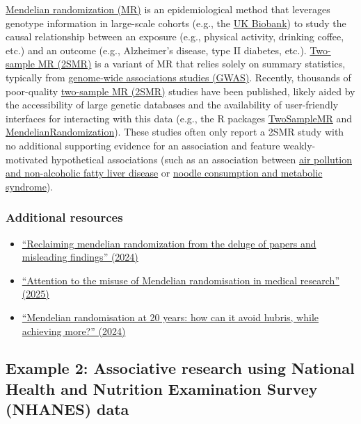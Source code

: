 \documentclass[letterpaper, 12pt]{article}
\begin{document}
\href{https://doi.org/10.1038/s43586-021-00092-5}{Mendelian randomization (MR)} is an epidemiological method that leverages genotype information in large-scale cohorts (e.g., the \href{https://www.ukbiobank.ac.uk/}{UK Biobank}) to study the causal relationship between an exposure (e.g., physical activity, drinking coffee, etc.) and an outcome (e.g., Alzheimer's disease, type II diabetes, etc.). \href{https://doi.org/10.1093/ije/dyx028}{Two-sample MR (2SMR)} is a variant of MR that relies solely on summary statistics, typically from \href{https://doi.org/10.1038/s43586-021-00056-9}{genome-wide associations studies (GWAS)}. Recently, thousands of poor-quality \href{https://doi.org/10.1093/ije/dyx028}{two-sample MR (2SMR)} studies have been published, likely aided by the accessibility of large genetic databases and the availability of user-friendly interfaces for interacting with this data (e.g., the R packages \href{https://doi.org/10.7554/eLife.34408}{TwoSampleMR} and \href{https://doi.org/10.12688/wellcomeopenres.19995.2}{MendelianRandomization}). These studies often only report a 2SMR study with no additional supporting evidence for an association and feature weakly-motivated hypothetical associations (such as an association between \href{http://dx.doi.org/10.3389/fendo.2024.1396032}{air pollution and non-alcoholic fatty liver disease} or \href{http://dx.doi.org/10.3390/nu15092091}{noodle consumption and metabolic syndrome}).

\subsubsection*{Additional resources}

\begin{itemize}
    \setlength\itemsep{-0.5em}
    \item \href{https://doi.org/10.1186/s12944-024-02284-w}{``Reclaiming mendelian randomization from the deluge of papers and misleading findings'' (2024)}
    \item \href{https://doi.org/10.1136/egastro-2025-100187}{``Attention to the misuse of Mendelian randomisation in medical research'' (2025)}
    \item \href{https://doi.org/10.1016/S2213-8587(23)00348-0}{``Mendelian randomisation at 20 years: how can it avoid hubris, while achieving more?'' (2024)}
\end{itemize}

\subsection*{Example 2: Associative research using National Health and Nutrition Examination Survey (NHANES) data}
\end{document}
